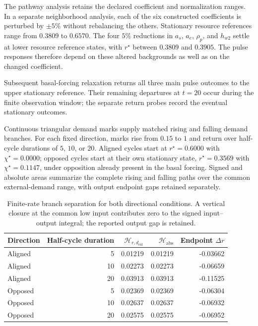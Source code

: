 The pathway analysis retains the declared coefficient and normalization ranges. In a separate neighborhood analysis, each of the six constructed coefficients is perturbed by $\pm5\%$ without rebalancing the others. Stationary resource references range from $0.3809$ to $0.6570$. The four $5\%$ reductions in $a_s$, $a_e$, $\rho_p$, and $h_{w2}$ settle at lower resource reference states, with $r^\star$ between $0.3809$ and $0.3905$. The pulse responses therefore depend on these altered backgrounds as well as on the changed coefficient.

Subsequent basal-forcing relaxation returns all three main pulse outcomes to the upper stationary reference. Their remaining departures at $t=20$ occur during the finite observation window; the separate return probes record the eventual stationary outcomes.

Continuous triangular demand marks supply matched rising and falling demand branches. For each fixed direction, marks rise from $0.15$ to $1$ and return over half-cycle durations of $5$, $10$, or $20$. Aligned cycles start at $r^\star=0.6000$ with $\chi^\star=0.0000$; opposed cycles start at their own stationary state, $r^\star=0.3569$ with $\chi^\star=0.1147$, under opposition already present in the basal forcing. Signed and absolute areas summarize the complete rising and falling paths over the common external-demand range, with output endpoint gaps retained separately.

\begin{table}[H]\centering\small

\begin{tabular}{@{}lrrrr@{}}\toprule

Direction & Half-cycle duration & $\mathcal H_{r,d_{\mathrm{ext}}}$ & $\mathcal H_{\mathrm{abs}}$ & Endpoint $\Delta r$ \\\midrule

Aligned & 5 & 0.01219 & 0.01219 & -0.03662 \\

Aligned & 10 & 0.02273 & 0.02273 & -0.06659 \\

Aligned & 20 & 0.03913 & 0.03913 & -0.11525 \\

Opposed & 5 & 0.02369 & 0.02369 & -0.06304 \\

Opposed & 10 & 0.02637 & 0.02637 & -0.06932 \\

Opposed & 20 & 0.02575 & 0.02575 & -0.06952 \\

\bottomrule\end{tabular}

\caption{Finite-rate branch separation for both directional conditions. A vertical closure at the common low input contributes zero to the signed input--output integral; the reported output gap is retained.}\label{tab:cycle-statistics}\end{table}


